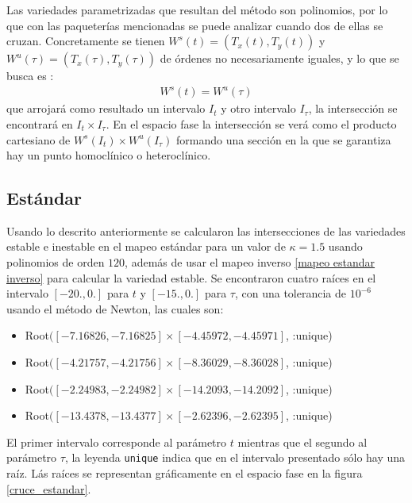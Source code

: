 Las variedades parametrizadas que resultan del método son polinomios, por lo que con las paqueterías  mencionadas se puede analizar cuando dos de ellas se cruzan. Concretamente se tienen  $W^{s}(t)=(T_{x}(t),T_{y}(t))$ y $W^{u}(\tau)=(T_{x}(\tau),T_{y}(\tau))$ de órdenes no necesariamente iguales, y lo que se busca es :
\begin{eqnarray}
W^{s}(t)=W^{u}(\tau)
\end{eqnarray}
que arrojará como resultado un intervalo $I_{t}$ y otro intervalo $I_{\tau}$, la intersección se encontrará en $I_{t}\times I_{\tau}$. En el espacio fase la intersección se verá como el producto cartesiano de $W^{s}(I_{t})\times W^{u}(I_{\tau})$ formando una sección en la que se garantiza hay un punto homoclínico o heteroclínico. 


\subsection{Estándar}
Usando lo descrito anteriormente se calcularon las intersecciones de las variedades estable e inestable en el mapeo estándar para un valor de $\kappa=1.5$ usando polinomios de orden $120$, además de usar el mapeo inverso \ref{mapeo estandar inverso} para calcular la variedad estable. Se encontraron cuatro raíces en el intervalo $[-20.,0.]$ para $t$  y $[-15.,0.]$ para $\tau$, con una tolerancia de $10^{-6}$ usando el método de Newton, las cuales son:
\begin{itemize}
\item Root$([-7.16826, -7.16825] \times [-4.45972, -4.45971]$, :unique)
\item Root$([-4.21757, -4.21756] \times [-8.36029, -8.36028]$, :unique)
\item Root$([-2.24983, -2.24982] \times [-14.2093, -14.2092]$, :unique)
\item Root$([-13.4378, -13.4377] \times [-2.62396, -2.62395]$, :unique)
\end{itemize}
El primer intervalo corresponde al parámetro $t$ mientras que el segundo al parámetro $\tau$, la leyenda \texttt{unique} indica que en el intervalo presentado sólo hay una raíz. Lás raíces se representan gráficamente en el espacio fase en la figura \ref{cruce_estandar}. 

